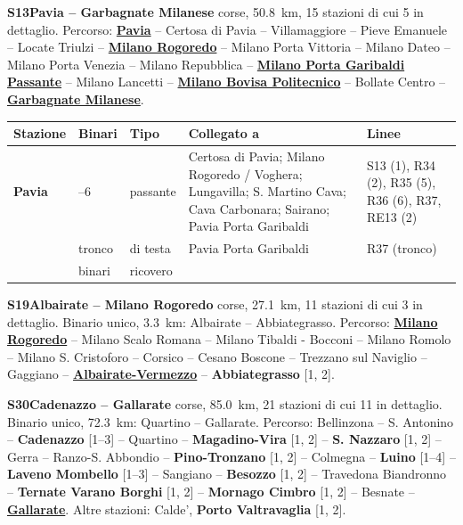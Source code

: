 \medskip\noindent\hypertarget{lin:S13}{\textbf{S13\enspace Pavia -- Garbagnate Milanese}} corse, \SI{50,8}{\km}, 15 stazioni di cui 5 in dettaglio. Percorso: \hyperlink{sta:S01860}{\textbf{Pavia}} -- Certosa di Pavia -- Villamaggiore -- Pieve Emanuele -- Locate Triulzi -- \hyperlink{sta:S01820}{\textbf{Milano Rogoredo}} -- Milano Porta Vittoria -- Milano Dateo -- Milano Porta Venezia -- Milano Repubblica -- \hyperlink{sta:S01647}{\textbf{Milano Porta Garibaldi Passante}} -- Milano Lancetti -- \hyperlink{sta:S01642}{\textbf{Milano Bovisa Politecnico}} -- Bollate Centro -- \hyperlink{sta:S01074}{\textbf{Garbagnate Milanese}}.
{\footnotesize\setlength{\LTpre}{2pt}\setlength{\LTpost}{0pt}
\begin{longtable}{@{}>{\raggedright\arraybackslash}p{}>{\raggedright\arraybackslash}p{}>{\raggedright\arraybackslash}p{}>{\raggedright\arraybackslash}p{}>{\raggedright\arraybackslash}p{}@{}}
\toprule
Stazione & Binari & Tipo & Collegato a & Linee \\
\midrule
\endhead
\leavevmode\hypertarget{sta:S01860}{}\textbf{Pavia} & 1--6 & passante & Certosa di Pavia; Milano Rogoredo / Voghera; Lungavilla; S. Martino Cava; Cava Carbonara; Sairano; Pavia Porta Garibaldi & S13 (1), R34 (2), R35 (5), R36 (6), R37, RE13 (2) \\
 & tronco & di testa & Pavia Porta Garibaldi & R37 (tronco) \\
 & 20 binari & ricovero & & \\
\bottomrule
\end{longtable}}

\medskip\noindent\hypertarget{lin:S19}{\textbf{S19\enspace Albairate -- Milano Rogoredo}} corse, \SI{27,1}{\km}, 11 stazioni di cui 3 in dettaglio. Binario unico, \SI{3,3}{\km}: Albairate -- Abbiategrasso. Percorso: \hyperlink{sta:S01820}{\textbf{Milano Rogoredo}} -- Milano Scalo Romana -- Milano Tibaldi - Bocconi -- Milano Romolo -- Milano S. Cristoforo -- Corsico -- Cesano Boscone -- Trezzano sul Naviglio -- Gaggiano -- \hyperlink{sta:S01059}{\textbf{Albairate-Vermezzo}} -- \hypertarget{sta:S01062}{\textbf{Abbiategrasso}} [1, 2].

\medskip\noindent\hypertarget{lin:S30}{\textbf{S30\enspace Cadenazzo -- Gallarate}} corse, \SI{85,0}{\km}, 21 stazioni di cui 11 in dettaglio. Binario unico, \SI{72,3}{\km}: Quartino -- Gallarate. Percorso: Bellinzona -- S. Antonino -- \hypertarget{sta:S05404}{\textbf{Cadenazzo}} [1--3] -- Quartino -- \hypertarget{sta:S05406}{\textbf{Magadino-Vira}} [1, 2] -- \hypertarget{sta:S05407}{\textbf{S. Nazzaro}} [1, 2] -- Gerra -- Ranzo-S. Abbondio -- \hypertarget{sta:S01110}{\textbf{Pino-Tronzano}} [1, 2] -- Colmegna -- \hypertarget{sta:S01113}{\textbf{Luino}} [1--4] -- \hypertarget{sta:S01118}{\textbf{Laveno Mombello}} [1--3] -- Sangiano -- \hypertarget{sta:S01141}{\textbf{Besozzo}} [1, 2] -- Travedona Biandronno -- \hypertarget{sta:S01143}{\textbf{Ternate Varano Borghi}} [1, 2] -- \hypertarget{sta:S01144}{\textbf{Mornago Cimbro}} [1, 2] -- Besnate -- \hyperlink{sta:S01030}{\textbf{Gallarate}}. Altre stazioni: Calde', \hypertarget{sta:S01116}{\textbf{Porto Valtravaglia}} [1, 2].

